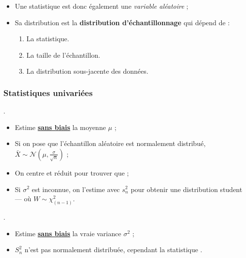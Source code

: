 \documentclass[french]{article}
\begin{document}
\begin{multicols*}{2}
\begin{definitionNOHFILL}[Statistique $T_{n}$]
\begin{itemize}
\item	Une statistique est donc également une \textit{variable aléatoire} ;
\item	Sa distribution est la \textbf{distribution d'échantillonnage} qui dépend de :
	\begin{enumerate}
	\item	La statistique.
	\item	La taille de l'échantillon.
	\item	La distribution sous-jacente des données.
	\end{enumerate}
\end{itemize}
\end{definitionNOHFILL}


\subsubsection{Statistiques univariées}
\begin{definitionNOHFILLprop}
.

\begin{itemize}
	\item	Estime \textbf{\underline{sans biais}} la moyenne $\mu$ ;
	\item	Si on pose que l'échantillon aléatoire est normalement distribué, $\bar{X}	\sim \mathcal{N}(\mu, \frac{\sigma}{\sqrt{n}})$ ;
	\item	On centre et réduit pour trouver que  ;
	\item	Si $\sigma^{2}$ est inconnue, on l'estime avec $s^{2}_{n}$ pour obtenir une distribution student--- où $W \sim \chi^{2}_{(n - 1)}$.
\end{itemize}
\end{definitionNOHFILLprop}

\begin{definitionNOHFILLprop}
.

\begin{itemize}
	\item	Estime \underline{\textbf{sans biais}} la vraie variance $\sigma^{2}$ ;
	\item	$S^{2}_{n}$ n'est pas normalement distribuée, cependant la statistique .
\end{itemize}
\end{definitionNOHFILLprop}


\end{multicols*}
\end{document}
